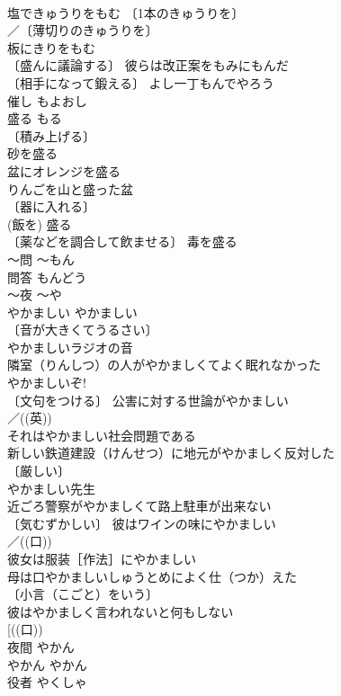 \documentclass[8pt]{extreport}
\begin{document}
\begin{CJK}{UTF8}{min}
\\	塩できゅうりをもむ 〔1本のきゅうりを〕
\\	／〔薄切りのきゅうりを〕
\\	板にきりをもむ 
\\	〔盛んに議論する〕 彼らは改正案をもみにもんだ 
\\	〔相手になって鍛える〕 よし一丁もんでやろう 
\\	催し	もよおし	
\\	盛る	もる	
\\	〔積み上げる〕
\\	砂を盛る 
\\	盆にオレンジを盛る 
\\	りんごを山と盛った盆 
\\	〔器に入れる〕
\\	(飯を) 盛る 
\\	〔薬などを調合して飲ませる〕 毒を盛る 
\\	～問	～もん	
\\	問答	もんどう	
\\	～夜	～や	
\\	やかましい	やかましい	
\\	〔音が大きくてうるさい〕
\\	やかましいラジオの音 
\\	隣室（りんしつ）の人がやかましくてよく眠れなかった 
\\	やかましいぞ! 
\\	〔文句をつける〕 公害に対する世論がやかましい 
\\	／((英))
\\	それはやかましい社会問題である 
\\	新しい鉄道建設（けんせつ）に地元がやかましく反対した 
\\	〔厳しい〕
\\	やかましい先生 
\\	近ごろ警察がやかましくて路上駐車が出来ない 
\\	〔気むずかしい〕 彼はワインの味にやかましい 
\\	／((口))
\\	彼女は服装［作法］にやかましい 
\\	母は口やかましいしゅうとめによく仕（つか）えた 
\\	〔小言（こごと）をいう〕　
\\	彼はやかましく言われないと何もしない 
\\	[((口)) 
\\	夜間	やかん	
\\	やかん	やかん	
\\	役者	やくしゃ	

\end{CJK}
\end{document}
